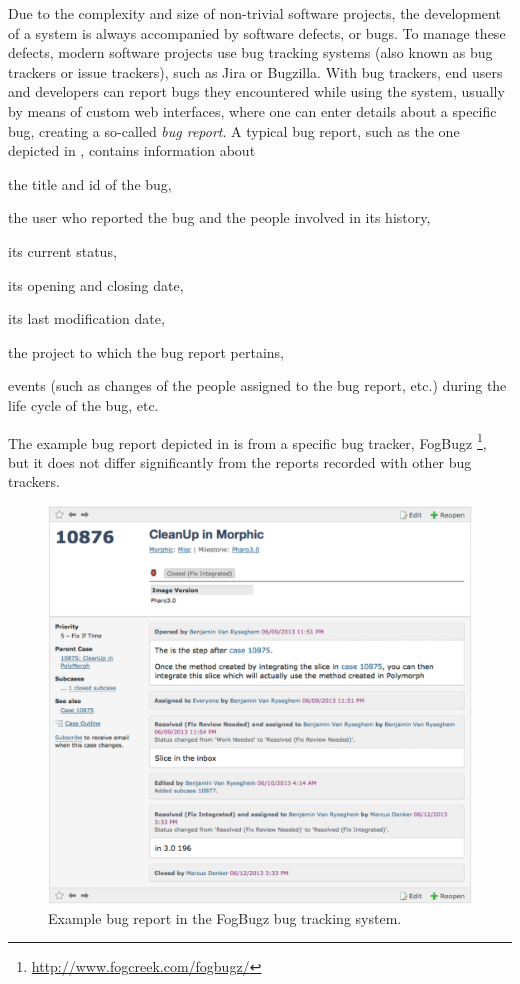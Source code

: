 Due to the complexity and size of non-trivial software projects, the development of a system is always accompanied by software defects, or bugs.
To manage these defects, modern software projects use bug tracking systems (also known as bug trackers or issue trackers), such as Jira or Bugzilla.
With bug trackers, end users and developers can report bugs they encountered while using the system, usually by means of custom web interfaces, where one can enter details about a specific bug, creating a so-called \emph{bug report}.
A typical bug report, such as the one depicted in , contains information about \begin{inparaenum}[(1)] \item the title and id of the bug, \item the user who reported the bug and the people involved in its history, \item its current status, \item its opening and closing date, \item its last modification date, \item the project to which the bug report pertains, \item events (such as changes of the people assigned to the bug report, etc.) during the life cycle of the bug, etc. \end{inparaenum}
The example bug report depicted in  is from a specific bug tracker, FogBugz \footnote{\url{http://www.fogcreek.com/fogbugz/}}, but it does not differ significantly from the reports recorded with other bug trackers.

\begin{figure}[ht]
\centering
\includegraphics[width=\linewidth,trim=0 300 0 0,clip=true]{Images/visualize/fogbugz-screen.png}
\caption{Example bug report in the FogBugz bug tracking system.}
\label{fogbugz-example}
\end{figure}

